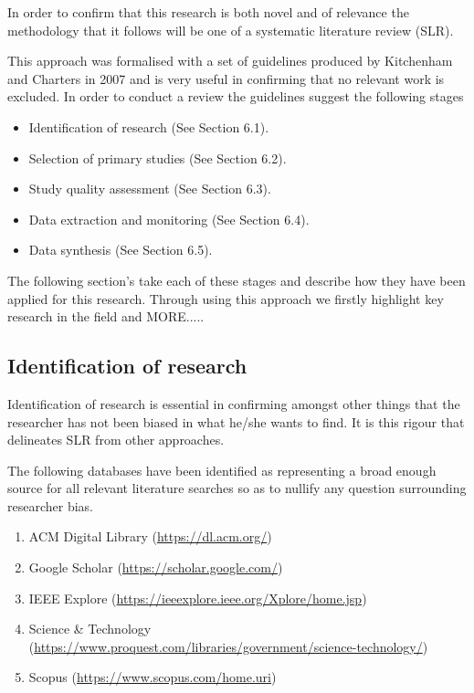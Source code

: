 \noindent
In order to confirm that this research is both novel and of relevance the methodology that it follows will be one of a systematic literature review (SLR).
\par
This approach was formalised with a set of guidelines produced by Kitchenham and Charters in 2007 and is very useful in confirming that no relevant work is excluded. In order to conduct a review the guidelines suggest the following stages

\begin{itemize}
  \item Identification of research (See Section 6.1).
  \item Selection of primary studies (See Section 6.2).
  \item Study quality assessment (See Section 6.3).
  \item Data extraction and monitoring (See Section 6.4).
  \item Data synthesis (See Section 6.5).
\end{itemize}

\noindent
The following section's take each of these stages and describe how they have been applied for this research. Through using this approach we firstly highlight key research in the field and MORE.....


\subsection{Identification of research}
Identification of research is essential in confirming amongst other things that the researcher has not been biased in what he/she wants to find. It is this rigour that delineates SLR from other approaches.
\par
The following databases have been identified as representing a broad enough source for all relevant literature searches so as to nullify any question surrounding researcher bias.

\begin{enumerate}
  \item ACM Digital Library (\href{https://dl.acm.org/}{https://dl.acm.org/})
  \item Google Scholar (\href{https://scholar.google.com/}{https://scholar.google.com/})
  \item IEEE Explore (\href{https://ieeexplore.ieee.org/Xplore/home.jsp}{https://ieeexplore.ieee.org/Xplore/home.jsp})
  \item Science \& Technology\\ (\href{https://www.proquest.com/libraries/government/science-technology/}{https://www.proquest.com/libraries/government/science-technology/})
  \item Scopus (\href{https://www.scopus.com/home.uri}{https://www.scopus.com/home.uri})
\end{enumerate}

